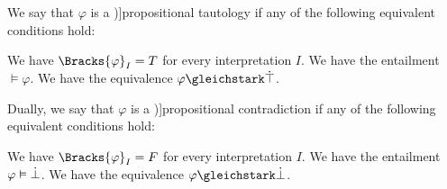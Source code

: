 \begin{definition}\label{def:propositional_tautology}
  We say that \( \varphi \) is a \term[ru=пропозициональная тавтология (\cite[44]{КолмогоровДрагалин2006})]{propositional tautology} if any of the following equivalent conditions hold:
  \begin{thmenum}
     We have \( \Bracks{\varphi}_I = T \) for every interpretation \( I \).
     We have the entailment \( \vDash \varphi \).
     We have the equivalence \( \varphi \gleichstark \syntop \).
  \end{thmenum}
\end{definition}

\begin{definition}\label{def:propositional_contradiction}
  Dually, we say that \( \varphi \) is a \term[en=contradictory (formula) (\cite[28]{Kleene2002Logic})]{propositional contradiction} if any of the following equivalent conditions hold:
  \begin{thmenum}
     We have \( \Bracks{\varphi}_I = F \) for every interpretation \( I \).
     We have the entailment \( \varphi \vDash \dot\bot \).
     We have the equivalence \( \varphi \gleichstark \synbot \).
  \end{thmenum}
\end{definition}

